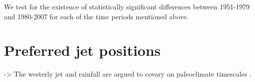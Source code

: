 \documentclass[draft,grl]{AGUTeX}
\begin{document}
\begin{article}
	
	We test for the existence of statistically significant differences between 1951-1979 and 1980-2007 for each of the time periods mentioned above.
	
\section{Preferred jet positions}
	
-> The westerly jet and rainfall are argued to covary on paleoclimate timescales \citep{Nagashima2011}\citep{Nagashima2013}.
	

\end{article}
\end{document}
